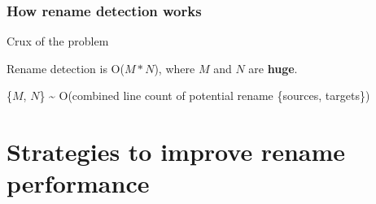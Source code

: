\documentclass[compress,t]{beamer}
\begin{document}
\begin{frame}
  \frametitle{How rename detection works}

    \vfill

    \begin{center}
    \begin{minipage}{0.83\textwidth}
    \begin{block}{\begin{center}Crux of the problem\end{center}}
      \begin{center}
        \vspace*{1\baselineskip}

        Rename detection is O($M*N$), where $M$ and $N$
        are \textbf{huge}.

        \vspace*{2\baselineskip}

        {\scriptsize
          \{{\color{mygreen}$M$}, {\color{orange}$N$}\}
          \textasciitilde{} O(combined line count of potential rename
          \{{\color{mygreen}sources}, {\color{orange}targets}\})
        }
      \end{center}
    \end{block}
    \end{minipage}
    \end{center}

    \vfill

\end{frame}

\section[Strategies]{Strategies to improve rename performance}
\end{document}
